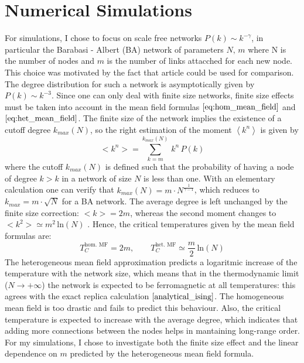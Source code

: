 \section{Numerical Simulations}
For simulations, I chose to focus on scale free networks $P(k) \sim k^{-\gamma}$, in particular the Barabasi - Albert (BA) network of parameters $N,\, m$ where N is the number of nodes and $m$ is the number of links attacched for each new node. This choice was motivated by the fact that article \cite{numeric_ising} could be used for comparison. The degree distribution for such a network is asymptotically given by $P(k) \sim k^{-3}$. Since one can only deal with finite size networks, finite size effects must be taken into account in the mean field formulas $\ref{eq:hom_mean_field}$ and $\ref{eq:het_mean_field}$.
The finite size of the network implies the existence of a cutoff degree $k_{max}(N)$, so the right estimation of the moment $\left\langle k^n \right \rangle$ is given by
\begin{equation*}
    <k^n> = \sum_{k=m}^{k_{max}(N)}\, k^n\,P(k)
\end{equation*}
where the cutoff $k_{max}(N)$ is defined such that the probability of having a node of degree $k>k$ in a network of size $N$ is less than one. With an elementary calculation one can verify that $k_{max}(N)= m\cdot N^{\frac{1}{\gamma -1}}$, which reduces to $k_{max} = m\cdot \sqrt{N}$ for a BA network.
The average degree is left unchanged by the finite size correction:  $<k> = 2m$, whereas the second moment changes to $<k^2> \simeq m^2\,\text{ln}(N)$ \cite{analytical_ising}. Hence, the critical temperatures given by the mean field formulas are:
\begin{equation}
    T_C^{\text{hom. MF}} = 2m, \quad \quad T_C^{\text{het. MF}} \simeq \frac{m}{2}\,\text{ln}(N)
\end{equation}
The heterogeneous mean field approximation predicts a logaritmic increase of the temperature with the network size, which means that in the thermodynamic limit ($N\rightarrow +\infty$) the network is expected to be ferromagnetic at all temperatures: this agrees with the exact replica calculation $\cite{analytical_ising}$. The homogeneous mean field is too drastic and fails to predict this behaviour. Also, the critical temperature is expected to increase with the average degree, which indicates that adding more connections between the nodes helps in mantaining long-range order. \\
For my simulations, I chose to investigate both the finite size effect and the linear dependence on $m$ predicted by the heterogeneous mean field formula.




